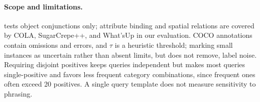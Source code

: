 \paragraph{Scope and limitations.}
\bench{} tests object conjunctions only; attribute binding and spatial relations are covered by COLA, SugarCrepe++, and What'sUp in our evaluation.
COCO annotations contain omissions and errors, and $\tau$ is a heuristic threshold; marking small instances as uncertain rather than absent limits, but does not remove, label noise.
Requiring disjoint positives keeps queries independent but makes most queries single-positive and favors less frequent category combinations, since frequent ones often exceed 20 positives.
A single query template does not measure sensitivity to phrasing.
